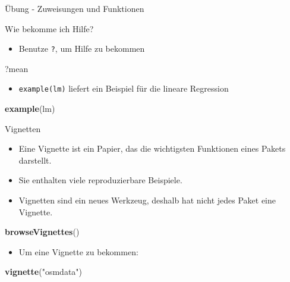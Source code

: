 \documentclass[ignorenonframetext,]{beamer}
\newenvironment{Shaded}{\begin{snugshade}}{\end{snugshade}}
\newcommand{\KeywordTok}[1]{\textcolor[rgb]{0.26,0.66,0.93}{\textbf{#1}}}
\newcommand{\NormalTok}[1]{\textcolor[rgb]{0.74,0.68,0.62}{#1}}
\newcommand{\StringTok}[1]{\textcolor[rgb]{0.02,0.61,0.04}{#1}}
\providecommand{\tightlist}{%
  \setlength{\itemsep}{0pt}\setlength{\parskip}{0pt}}
\begin{document}
\begin{frame}[fragile]{Übung - Zuweisungen und Funktionen}
\begin{frame}[fragile]{Wie bekomme ich Hilfe?}
\begin{itemize}
\tightlist
\item
  Benutze \texttt{?}, um Hilfe zu bekommen
\end{itemize}

\begin{Shaded}
\begin{Highlighting}[]
\NormalTok{?mean}
\end{Highlighting}
\end{Shaded}

\begin{itemize}
\tightlist
\item
  \texttt{example(lm)} liefert ein Beispiel für die lineare Regression
\end{itemize}

\begin{Shaded}
\begin{Highlighting}[]
\KeywordTok{example}\NormalTok{(lm)}
\end{Highlighting}
\end{Shaded}

\end{frame}

\begin{frame}[fragile]{Vignetten}
\protect\hypertarget{vignetten}{}

\begin{itemize}
\tightlist
\item
  Eine Vignette ist ein Papier, das die wichtigsten Funktionen eines
  Pakets darstellt.
\item
  Sie enthalten viele reproduzierbare Beispiele.
\item
  Vignetten sind ein neues Werkzeug, deshalb hat nicht jedes Paket eine
  Vignette.
\end{itemize}

\begin{Shaded}
\begin{Highlighting}[]
\KeywordTok{browseVignettes}\NormalTok{()}
\end{Highlighting}
\end{Shaded}

\begin{itemize}
\tightlist
\item
  Um eine Vignette zu bekommen:
\end{itemize}

\begin{Shaded}
\begin{Highlighting}[]
\KeywordTok{vignette}\NormalTok{(}\StringTok{"osmdata"}\NormalTok{)}
\end{Highlighting}
\end{Shaded}


\end{frame}
\end{frame}
\end{document}
